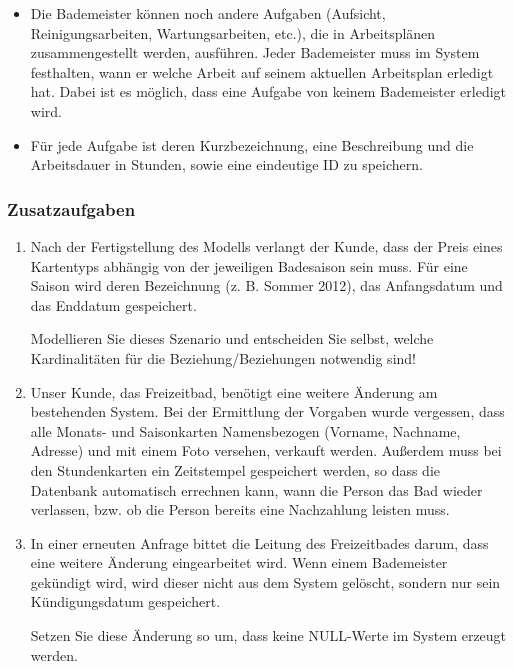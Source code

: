 \begin{itemize}
          \clearpage
    \item Die Bademeister können noch andere Aufgaben (Aufsicht, Reinigungsarbeiten,
          Wartungsarbeiten, etc.), die in Arbeitsplänen zusammengestellt werden, ausführen. Jeder Bademeister muss im System festhalten, wann er welche Arbeit auf seinem aktuellen Arbeitsplan erledigt hat. Dabei ist es möglich, dass eine Aufgabe von keinem Bademeister erledigt wird.
    \item Für jede Aufgabe ist deren Kurzbezeichnung, eine Beschreibung und die
          Arbeitsdauer in Stunden, sowie eine eindeutige ID zu speichern.
\end{itemize}

\subsubsection{Zusatzaufgaben}
\begin{enumerate} %
    \item Nach der Fertigstellung des Modells verlangt der Kunde, dass der Preis eines
          Kartentyps abhängig von der jeweiligen Badesaison sein muss. Für eine Saison wird deren
          Bezeichnung (z. B. Sommer 2012), das Anfangsdatum und das Enddatum gespeichert.

          Modellieren Sie dieses Szenario und entscheiden Sie selbst, welche Kardinalitäten für die
          Beziehung/Beziehungen notwendig sind!

    \item Unser Kunde, das Freizeitbad, benötigt eine weitere Änderung am bestehenden System.
          Bei der Ermittlung der Vorgaben wurde vergessen, dass alle Monats- und Saisonkarten
          Namensbezogen (Vorname, Nachname, Adresse) und mit einem Foto versehen, verkauft werden.
          Auß{}erdem muss bei den Stundenkarten ein Zeitstempel gespeichert werden, so dass die
          Datenbank automatisch errechnen kann, wann die Person das Bad wieder verlassen, bzw. ob die
          Person bereits eine Nachzahlung leisten muss.

    \item In einer erneuten Anfrage bittet die Leitung des Freizeitbades darum, dass eine weitere
          Änderung eingearbeitet wird. Wenn einem Bademeister gekündigt wird, wird dieser nicht aus
          dem System gelöscht, sondern nur sein Kündigungsdatum gespeichert.

          Setzen Sie diese Änderung so um, dass keine NULL-Werte im System erzeugt werden.
\end{enumerate}%
\clearpage
